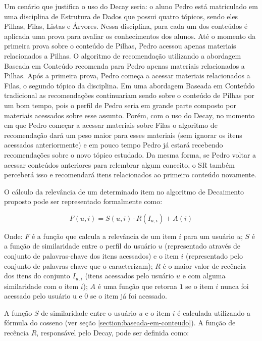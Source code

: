 Um cenário que justifica o uso do Decay seria: o aluno Pedro está matriculado em uma disciplina de Estrutura de Dados
que possui quatro tópicos, sendo eles Pilhas, Filas, Listas e Árvores. Nessa disciplina, para cada um dos conteúdos é
aplicada uma prova para avaliar os conhecimentos dos alunos. Até o momento da primeira prova sobre o conteúdo de Pilhas,
Pedro acessou apenas materiais relacionados a Pilhas. O algoritmo de recomendação utilizando a abordagem Baseada em
Conteúdo recomenda para Pedro apenas materiais relacionados a Pilhas. Após a primeira prova, Pedro começa a acessar
materiais relacionados a Filas, o segundo tópico da disciplina. Em uma abordagem Baseada em Conteúdo tradicional as
recomendações continuariam sendo sobre o conteúdo de Pilhas por um bom tempo, pois o perfil de Pedro seria em grande
parte composto por materiais acessados sobre esse assunto. Porém, com o uso do Decay, no momento em que Pedro começar a
acessar materiais sobre Filas o algoritmo de recomendação dará um peso maior para esses materiais (sem ignorar os itens
acessados anteriormente) e em pouco tempo Pedro já estará recebendo recomendações sobre o novo tópico estudado. Da mesma
forma, se Pedro voltar a acessar conteúdos anteriores para relembrar algum conceito, o SR também perceberá isso e
recomendará itens relacionados ao primeiro conteúdo novamente.

O cálculo da relevância de um determinado item no algoritmo de Decaimento proposto pode ser representado formalmente
como:

\begin{equation}
  F(u,i) = S(u,i) \cdot R(I_{u,i}) + A(i)
  \label{eq:relevancia-proposta}
\end{equation}

Onde: $F$ é a função que calcula a relevância de um item $i$ para um usuário $u$; $S$ é a função de similaridade entre
o perfil do usuário $u$ (representado através de conjunto de palavras-chave dos itens acessados) e o item $i$
(representado pelo conjunto de palavras-chave que o caracterizam); $R$ é o maior valor de recência dos itens do conjunto
$I_{u,i}$ (itens acessados pelo usuário $u$ e com alguma similaridade com o item $i$); $A$ é uma função que retorna $1$
se o item $i$ nunca foi acessado pelo usuário u e $0$ se o item já foi acessado.

A função $S$ de similaridade entre o usuário $u$ e o item $i$ é calculada utilizando a fórmula do cosseno (ver seção
\ref{section:baseada-em-conteudo}). A função de recência $R$, responsável pelo Decay, pode ser definida como:

